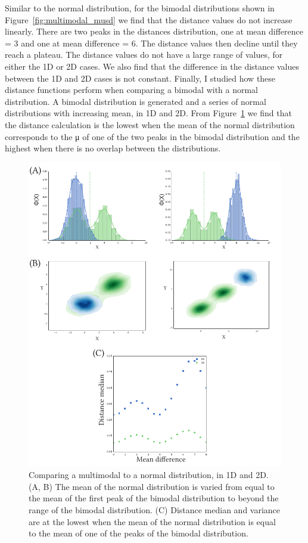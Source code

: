Similar to the normal distribution, for the bimodal distributions shown in Figure~\ref{fig:multimodal_musd} we find that the distance values do not increase linearly. There are two peaks in the distances distribution, one at mean difference = 3 and one at mean difference = 6. The distance values then decline until they reach a plateau. The distance values do not have a large range of values, for either the 1D or 2D cases. We also find that the difference in the distance values between the 1D and 2D cases is not constant. Finally, I studied how these distance functions perform when comparing a bimodal with a normal distribution. A bimodal distribution is generated and a series of normal distributions with increasing mean, in 1D and 2D. From Figure~\ref{fig:multimodal_v_normal} we find that the distance calculation is the lowest when the mean of the normal distribution corresponds to the μ of one of the two peaks in the bimodal distribution and the highest when there is no overlap between the distributions.


\begin{figure}[tb]
\centering
\includegraphics[scale=0.7]{../../chapters/chapterABCFlow/images/multimodal_v_normal.pdf}
\caption[Distance value ranges of bimodal and uniform distributions using the kernel distance]{Comparing a multimodal to a normal distribution, in 1D and 2D. (A, B) The mean of the normal distribution is varied from equal to the mean of the first peak of the bimodal distribution to beyond the range of the bimodal distribution. (C) Distance median and variance are at the lowest when the mean of the normal distribution is equal to the mean of one of the peaks of the bimodal distribution. }
\label{fig:multimodal_v_normal}
\end{figure}



